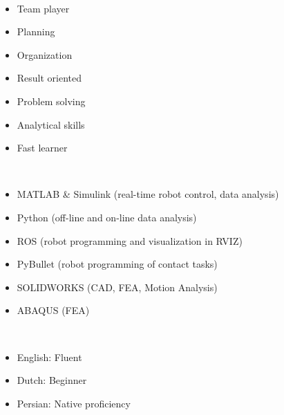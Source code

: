\documentclass[lighthipster]{simplehipstercv}
\begin{document}
\begin{paracol}{2}
{			\bigskip
			\bigskip
			
					
			\bigskip
			\bigskip
			
			 \\[0.5em]
			\begin{itemize}[leftmargin=1em, itemsep=0pt, topsep=0pt]
				\item Team player
				\item Planning
				\item Organization
				\item Result oriented
				\item Problem solving
				\item Analytical skills
				\item Fast learner
			\end{itemize}
			
			\bigskip	
			\bigskip
			\bigskip
			\bigskip
			
			 \\[0.5em]
			
			\begin{itemize}[leftmargin=1em, itemsep=0pt, topsep=0pt]
				\item MATLAB \& Simulink (real-time robot control, data analysis)
				\item Python (off-line and on-line data analysis)
				\item ROS (robot programming and visualization in RVIZ)
				\item PyBullet (robot programming of contact tasks)
				\item SOLIDWORKS (CAD, FEA, Motion Analysis)
				\item ABAQUS (FEA)
			\end{itemize}
				
			\bigskip		
			\bigskip
			\bigskip
			\bigskip

			\\[0.5em]
			\begin{itemize}[leftmargin=1em, itemsep=0pt, topsep=0pt]
				\item English: Fluent
				\item Dutch: Beginner
				\item Persian: Native proficiency
			\end{itemize}
			
}
\end{paracol}
\end{document}
